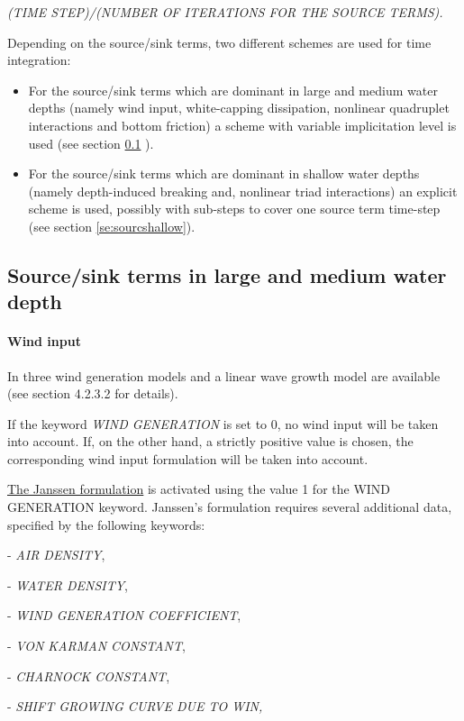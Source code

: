  \textit{(TIME STEP)/(NUMBER OF ITERATIONS FOR THE SOURCE TERMS).}

 Depending on the source/sink terms, two different schemes are used for time integration:

\begin{itemize}
\item  For the source/sink terms which are dominant in large and medium water depths (namely wind input, white-capping dissipation, nonlinear quadruplet interactions and bottom friction) a scheme with variable implicitation level is used (see section \ref{se:sourclarge}
).

\item  For the source/sink terms which are dominant in shallow water depths (namely depth-induced breaking and, nonlinear triad interactions) an explicit scheme is used, possibly with sub-steps to cover one source term time-step (see section \ref{se:sourcshallow}).
\end{itemize}


\subsection{ Source/sink terms in large and medium water depth}
\label{se:sourclarge}

\paragraph{ Wind input}

 In \tomawac three wind generation models and a linear wave growth model are available (see section 4.2.3.2 for details).

 If the keyword \textit{WIND GENERATION} is set to 0, no wind input will be taken into account. If, on the other hand, a strictly positive value is chosen, the corresponding wind input formulation will be taken into account.

 \underline{ The Janssen formulation} is activated using the value 1 for the WIND GENERATION keyword. Janssen's formulation requires several additional data, specified by the following keywords:
 
- \textit{AIR DENSITY},

- \textit{WATER DENSITY},  

- \textit{WIND GENERATION COEFFICIENT}, 

- \textit{VON KARMAN CONSTANT}, 

- \textit{CHARNOCK CONSTANT},   

- \textit{SHIFT GROWING CURVE DUE TO WIN,} 

